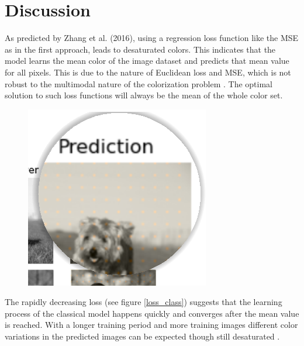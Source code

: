 \documentclass[12pt,letterpaper]{article}
\begin{document}
\section{Discussion}
As predicted by Zhang et al. (2016), using a regression loss function like the MSE as in the first approach, leads to desaturated colors. This indicates that the model learns the mean color of the image dataset and predicts that mean value for all pixels. This is due to the nature of Euclidean loss and MSE, which is not robust to the multimodal nature of the colorization problem \citep{Zhang.2016}. The optimal solution to such loss functions will always be the mean of the whole color set.\\
\begin{figure}
	\centering
	\includegraphics[width=.40\textwidth]{dots.png}
	\caption{}
	\label{dots}
\end{figure}
The rapidly decreasing loss (see figure \ref{loss_class}) suggests that the learning process of the classical model happens quickly and converges after the mean value is reached. With a longer training period and more training images different color variations in the predicted images can be expected though still desaturated \citep{Zhang.2016}.\\
\end{document}
